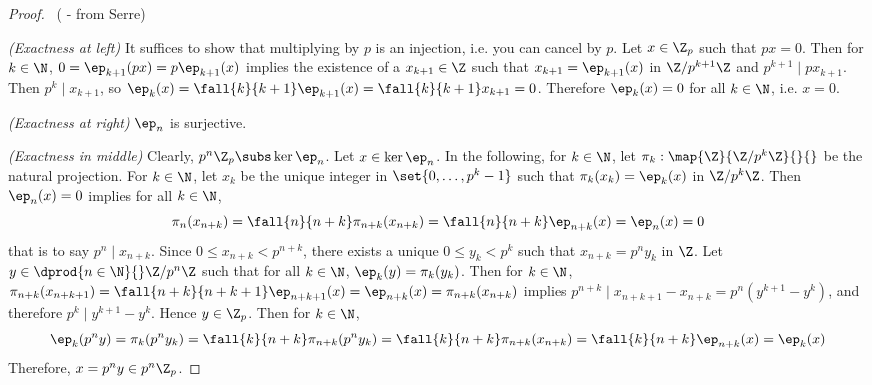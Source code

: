 \begin{proof}~( - from Serre)

  \textit{(Exactness at left)}
  It suffices to show that multiplying by $p$ is an injection,
  i.e. you can cancel by $p$. 
  Let $x \in \Z_p$ such that $p x = 0$. 
  Then for $k \in \N$, $0 = \ep_{k+1}(p x) = p \ep_{k+1}(x)$ implies 
  the existence of a $x_{k+1} \in \Z$ such that 
  $x_{k+1} = \ep_{k+1}(x)$ in $\Z/p^{k+1}\Z$ and 
  $p^{k+1} \mid p x_{k+1}$. 
  Then $p^k \mid x_{k+1}$, so 
  $\ep_k(x) = \fall{k}{k+1} \ep_{k+1}(x) = \fall{k}{k+1} x_{k+1} = 0$. 
  Therefore $\ep_k(x) = 0$ for all $k \in \N$, i.e. $x = 0$. 

  \textit{(Exactness at right)} $\ep_n$ is surjective. 

  \textit{(Exactness in middle)} Clearly, $p^n\Z_p \subs \ker \ep_n$. 
  Let $x \in \ker \ep_n$.
  In the following, for $k \in \N$, 
  let $\pi_k : \map{\Z}{\Z/p^k\Z}{}{}$ be the natural projection. 
  For $k \in \N$, let $x_k$ be the unique integer in $\set{0,\dots,p^k-1}$ 
  such that $\pi_k(x_k) = \ep_k(x)$ in $\Z/p^k\Z$. 
  Then $\ep_n(x) = 0$ implies for all $k \in \N$, 
  \[ \pi_n (x_{n+k}) = \fall{n}{n+k} \pi_{n+k}(x_{n+k}) 
  = \fall{n}{n+k} \ep_{n+k}(x) = \ep_n(x) = 0 \] 
  that is to say $p^n \mid x_{n+k}$. 
  Since $0 \leq x_{n+k} < p^{n+k}$, 
  there exists a unique $0 \leq y_k < p^k$ such that 
  $x_{n+k} = p^n y_k$ in $\Z$. 
  Let $y \in \dprod{n \in \N}{} \Z/p^n\Z$ such that for all $k \in\N$, 
  $\ep_k(y) = \pi_k(y_k)$. 
  Then for $k \in \N$, 
  $\pi_{n+k}(x_{n+k+1}) = \fall{n+k}{n+k+1}\ep_{n+k+1}(x) 
  = \ep_{n+k}(x) = \pi_{n+k}(x_{n+k})$
  implies $p^{n+k} \mid x_{n+k+1} - x_{n+k} = p^n(y^{k+1} - y^k)$,
  and therefore $p^k \mid y^{k+1} - y^k$.
  Hence $y \in \Z_p$. 
  Then for $k \in \N$, 
  \[
    \ep_k(p^n y) = \pi_k(p^n y_k) = \fall{k}{n+k}\pi_{n+k}(p^n y_k)
    = \fall{k}{n+k} \pi_{n+k}(x_{n+k}) = \fall{k}{n+k} \ep_{n+k}(x)
    = \ep_k(x)
  \]
  Therefore, $x = p^n y \in p^n \Z_p$.
\end{proof}

